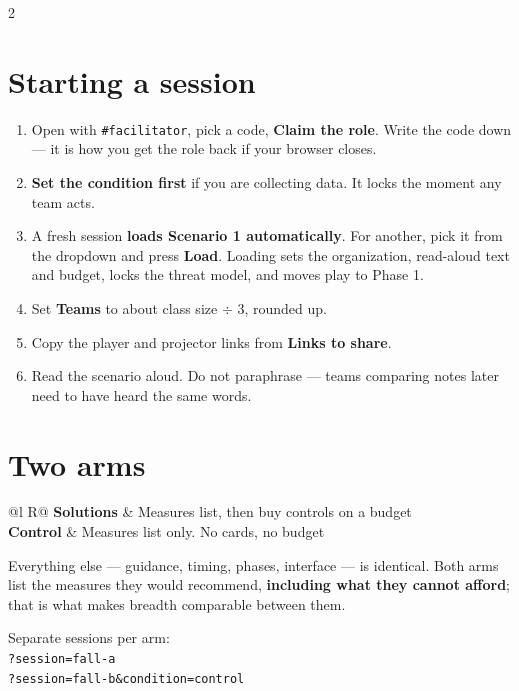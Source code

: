 \documentclass[9pt,letterpaper]{extarticle}
\begin{document}
\vspace{0.4em}
\begin{multicols}{2}

\section{Starting a session}
\begin{enumerate}[label=\arabic*.]
\item Open with \texttt{\#facilitator}, pick a code, \textbf{Claim the role}.
Write the code down --- it is how you get the role back if your browser closes.
\item \textbf{Set the condition first} if you are collecting data. It locks the
moment any team acts.
\item A fresh session \textbf{loads Scenario 1 automatically}. For another, pick
it from the dropdown and press \textbf{Load}. Loading sets the organization,
read-aloud text and budget, locks the threat model, and moves play to Phase 1.
\item Set \textbf{Teams} to about class size $\div$ 3, rounded up.
\item Copy the player and projector links from \textbf{Links to share}.
\item Read the scenario aloud. Do not paraphrase --- teams comparing notes later
need to have heard the same words.
\end{enumerate}

\section{Two arms}
\small
\begin{tabularx}{\linewidth}{@{}l R@{}}
\toprule
\textbf{Solutions} & Measures list, then buy controls on a budget \\
\textbf{Control} & Measures list only. No cards, no budget \\
\bottomrule
\end{tabularx}
\normalsize
\vspace{0.3em}

Everything else --- guidance, timing, phases, interface --- is identical. Both arms
list the measures they would recommend, \textbf{including what they cannot
afford}; that is what makes breadth comparable between them.

\vspace{0.3em}
Separate sessions per arm:\\
\texttt{?session=fall-a}\\
\texttt{?session=fall-b\&condition=control}


\end{multicols}
\end{document}
